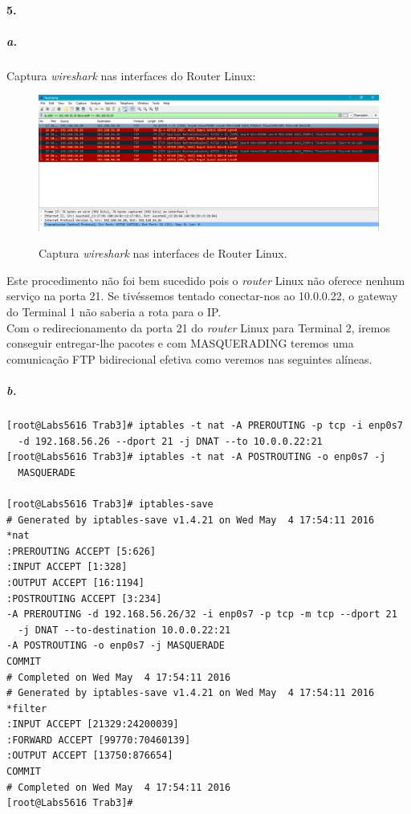 \newpage

\paragraph{5.}

\subparagraph{a.}
Captura \emph{wireshark} nas interfaces do \textsf{Router Linux}:

\begin{figure}[h]
\centering
\includegraphics[width=1\textwidth, height=0.3\textheight]{5a.png}
\label{fig:enp0s7}
\caption{Captura \emph{wireshark} nas interfaces de \textsf{Router Linux}.}
\end{figure}

Este procedimento não foi bem sucedido pois o \textsf{\emph{router} Linux} 
não oferece nenhum serviço na porta 21. Se tivéssemos tentado conectar-nos 
ao \textsf{10.0.0.22}, o \textsf{gateway} do \textsf{Terminal 1} não saberia 
a rota para o IP.\\
Com o redirecionamento da porta 21 do \textsf{\emph{router} Linux} para 
\textsf{Terminal 2}, iremos conseguir entregar-lhe pacotes e com 
\textsf{MASQUERADING} teremos uma comunicação FTP bidirecional efetiva 
como veremos nas seguintes alíneas.


\subparagraph{b.}
\begin{verbatim}
[root@Labs5616 Trab3]# iptables -t nat -A PREROUTING -p tcp -i enp0s7 
  -d 192.168.56.26 --dport 21 -j DNAT --to 10.0.0.22:21
[root@Labs5616 Trab3]# iptables -t nat -A POSTROUTING -o enp0s7 -j
  MASQUERADE

[root@Labs5616 Trab3]# iptables-save
# Generated by iptables-save v1.4.21 on Wed May  4 17:54:11 2016
*nat
:PREROUTING ACCEPT [5:626]
:INPUT ACCEPT [1:328]
:OUTPUT ACCEPT [16:1194]
:POSTROUTING ACCEPT [3:234]
-A PREROUTING -d 192.168.56.26/32 -i enp0s7 -p tcp -m tcp --dport 21 
  -j DNAT --to-destination 10.0.0.22:21
-A POSTROUTING -o enp0s7 -j MASQUERADE
COMMIT
# Completed on Wed May  4 17:54:11 2016
# Generated by iptables-save v1.4.21 on Wed May  4 17:54:11 2016
*filter
:INPUT ACCEPT [21329:24200039]
:FORWARD ACCEPT [99770:70460139]
:OUTPUT ACCEPT [13750:876654]
COMMIT
# Completed on Wed May  4 17:54:11 2016
[root@Labs5616 Trab3]# 
\end{verbatim}


